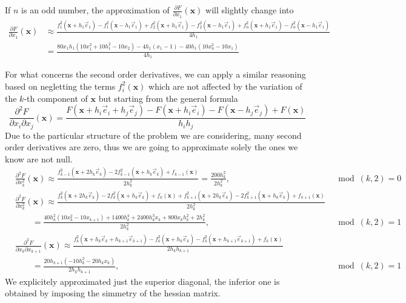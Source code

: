 If $n$ is an odd number, the approximation of $\frac{\partial F}{\partial x_1} (\mathbf{x})$ will slightly change into 
\begin{align*}
\frac{\partial F}{\partial x_1} (\mathbf{x}) & \approx  \frac{f_{1}^2(\mathbf{x} + h_1 \vec{e}_1) - f_{1}^2(\mathbf{x} - h_1 \vec{e}_1) + f_{2}^2(\mathbf{x} + h_1 \vec{e}_1) - f_{2}^2(\mathbf{x} - h_1 \vec{e}_1) + f_n^2(\mathbf{x} + h_1 \vec{e}_1) - f_n^2(\mathbf{x} - h_1\vec{e}_1)}{4h_1} \\ &
 = \frac{80x_1 h_1(10x_1^2 + 10 h_1^2 -10x_{2}) - 4h_1 (x_1 -1) -40h_1 (10x_n^2 - 10x_1) }{4h_1}
\end{align*}

For what concerns the second order derivatives, we can apply a similar reasoning based on negletting the terms $f_i^2(\mathbf{x})$ which are not affected by the variation of the $k$-th component of $\mathbf{x}$ but starting from the general formula
$$ \frac{\partial^2 F}{\partial x_i \partial x_j} (\mathbf{x})  = \frac{F(\mathbf{x} + h_i \vec{e}_i + h_j \vec{e}_j) - F(\mathbf{x} + h_i \vec{e}_i) - F(\mathbf{x} - h_j \vec{e}_j) + F(\mathbf{x})}{h_i h_j}$$
Due to the particular structure of the problem we are considering, many second order derivatives are zero, thus we are going to approximate solely the ones we know are not null.
\begin{align*}
    & \frac{\partial^2 F}{\partial x_k^2} (\mathbf{x}) \approx \frac{f_{k-1}^2 (\mathbf{x} + 2h_k \vec{e}_k) - 2 f_{k-1}^2 (\mathbf{x} + h_k \vec{e}_k) + f_{k-1}(\mathbf{x})}{2h_k^2} = \frac{200h_k^2}{2 h_k^2}, & \mod(k,2) = 0 \\
    & \frac{\partial^2 F}{\partial x_k^2} (\mathbf{x}) \approx \frac{f_{k}^2 (\mathbf{x} + 2h_k \vec{e}_k) - 2 f_{k}^2 (\mathbf{x} + h_k \vec{e}_k) + f_{k}(\mathbf{x}) + f_{k+1}^2 (\mathbf{x} + 2h_k \vec{e}_k) - 2 f_{k+1}^2 (\mathbf{x} + h_k \vec{e}_k) + f_{k+1}(\mathbf{x})}{2h_k^2} \\
    & \qquad = \frac{40h_k^2 (10x_k^2 - 10x_{k+1}) + 1400 h_k^4 + 2400h_k^3 x_k + 800 x_k h_k^2 + 2h_k^2}{2 h_k^2}, & \mod(k,2) = 1 \\
    & \frac{\partial^2 F}{\partial x_k \partial x_{k+1}} (\mathbf{x}) \approx \frac{f_{k}^2 (\mathbf{x} + h_k \vec{e}_k + h_{k+1} \vec{e}_{k+1}) - f_{k}^2 (\mathbf{x} + h_k \vec{e}_k) - f_{k}^2 (\mathbf{x} + h_{k+1} \vec{e}_{k+1}) + f_{k}(\mathbf{x})}{2h_k h_{k+1}} \\
    & \qquad = \frac{20h_{k+1} (-10h_k^2 - 20h_k x_k)}{2h_k h_{k+1}}, & \mod(k,2) = 1
\end{align*}
We explicitely approximated just the superior diagonal, the inferior one is obtained by imposing the simmetry of the hessian matrix.

